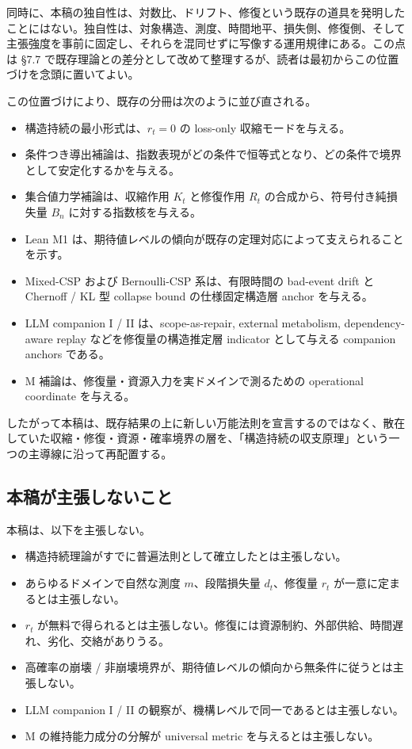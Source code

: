 \documentclass[12pt,a4paper]{article}
\begin{document}
同時に、本稿の独自性は、対数比、ドリフト、修復という既存の道具を発明したことにはない。独自性は、対象構造、測度、時間地平、損失側、修復側、そして主張強度を事前に固定し、それらを混同せずに写像する運用規律にある。この点は §7.7 で既存理論との差分として改めて整理するが、読者は最初からこの位置づけを念頭に置いてよい。

この位置づけにより、既存の分冊は次のように並び直される。

\begin{itemize}
\tightlist
\item
  構造持続の最小形式は、\(r_{t}=0\) の loss-only 収縮モードを与える。
\item
  条件つき導出補論は、指数表現がどの条件で恒等式となり、どの条件で境界として安定化するかを与える。
\item
  集合値力学補論は、収縮作用 \(K_{t}\) と修復作用 \(R_{t}\) の合成から、符号付き純損失量 \(B_{n}\) に対する指数核を与える。
\item
  Lean M1 は、期待値レベルの傾向が既存の定理対応によって支えられることを示す。
\item
  Mixed-CSP および Bernoulli-CSP 系は、有限時間の bad-event drift と Chernoff / KL 型 collapse bound の仕様固定構造層 anchor を与える。
\item
  LLM companion I / II は、scope-as-repair, external metabolism, dependency-aware replay などを修復量の構造推定層 indicator として与える companion anchors である。
\item
  M 補論は、修復量・資源入力を実ドメインで測るための operational coordinate を与える。
\end{itemize}

したがって本稿は、既存結果の上に新しい万能法則を宣言するのではなく、散在していた収縮・修復・資源・確率境界の層を、「構造持続の収支原理」という一つの主導線に沿って再配置する。

\subsection{本稿が主張しないこと}\label{ux672cux7a3fux304cux4e3bux5f35ux3057ux306aux3044ux3053ux3068}

本稿は、以下を主張しない。

\begin{itemize}
\tightlist
\item
  構造持続理論がすでに普遍法則として確立したとは主張しない。
\item
  あらゆるドメインで自然な測度 \(m\)、段階損失量 \(d_{t}\)、修復量 \(r_{t}\) が一意に定まるとは主張しない。
\item
  \(r_{t}\) が無料で得られるとは主張しない。修復には資源制約、外部供給、時間遅れ、劣化、交絡がありうる。
\item
  高確率の崩壊 / 非崩壊境界が、期待値レベルの傾向から無条件に従うとは主張しない。
\item
  LLM companion I / II の観察が、機構レベルで同一であるとは主張しない。
\item
  M の維持能力成分の分解が universal metric を与えるとは主張しない。
\end{itemize}
\end{document}
